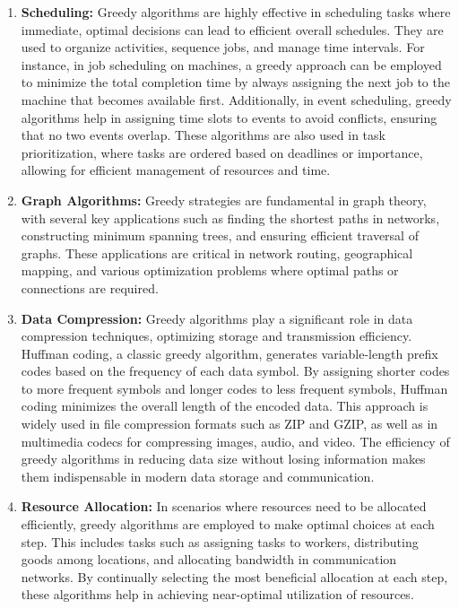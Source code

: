 \documentclass{article}
\begin{document}
    \begin{enumerate}
        \item \textbf{Scheduling:} Greedy algorithms are highly effective in scheduling tasks where immediate, optimal decisions can lead to efficient overall schedules. They are used to organize activities, sequence jobs, and manage time intervals. For instance, in job scheduling on machines, a greedy approach can be employed to minimize the total completion time by always assigning the next job to the machine that becomes available first. Additionally, in event scheduling, greedy algorithms help in assigning time slots to events to avoid conflicts, ensuring that no two events overlap. These algorithms are also used in task prioritization, where tasks are ordered based on deadlines or importance, allowing for efficient management of resources and time. \cite{greedyalgorithmexamples}

        \item \textbf{Graph Algorithms:} Greedy strategies are fundamental in graph theory, with several key applications such as finding the shortest paths in networks, constructing minimum spanning trees, and ensuring efficient traversal of graphs. These applications are critical in network routing, geographical mapping, and various optimization problems where optimal paths or connections are required. \cite{greedyalgorithmexamples}

        \item \textbf{Data Compression:} Greedy algorithms play a significant role in data compression techniques, optimizing storage and transmission efficiency. Huffman coding, a classic greedy algorithm, generates variable-length prefix codes based on the frequency of each data symbol. By assigning shorter codes to more frequent symbols and longer codes to less frequent symbols, Huffman coding minimizes the overall length of the encoded data. This approach is widely used in file compression formats such as ZIP and GZIP, as well as in multimedia codecs for compressing images, audio, and video. The efficiency of greedy algorithms in reducing data size without losing information makes them indispensable in modern data storage and communication. \cite{greedyalgorithmexamples}

        \item \textbf{Resource Allocation:} In scenarios where resources need to be allocated efficiently, greedy algorithms are employed to make optimal choices at each step. This includes tasks such as assigning tasks to workers, distributing goods among locations, and allocating bandwidth in communication networks. By continually selecting the most beneficial allocation at each step, these algorithms help in achieving near-optimal utilization of resources. \cite{greedyalgorithmexamples}


\end{enumerate}
\end{document}
